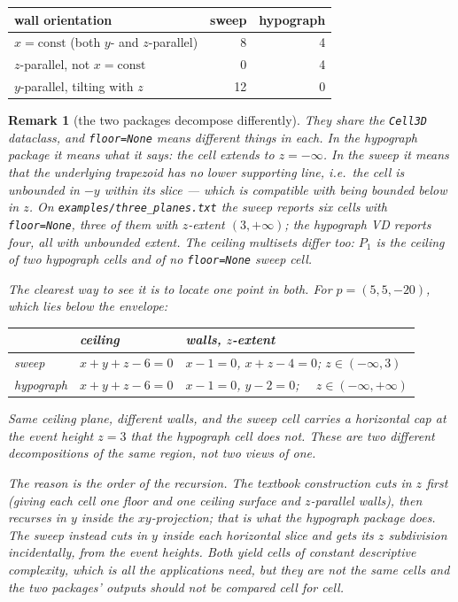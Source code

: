 \documentclass[11pt]{article}
\newtheorem{remark}{Remark}
\begin{document}
\begin{center}
\begin{tabular}{lrr}
\toprule
wall orientation & sweep & hypograph \\
\midrule
$x = \mathrm{const}$ (both $y$- and $z$-parallel) & 8 & 4 \\
$z$-parallel, not $x = \mathrm{const}$            & 0 & 4 \\
$y$-parallel, tilting with $z$                    & 12 & 0 \\
\bottomrule
\end{tabular}
\end{center}

\begin{remark}[the two packages decompose differently]
\label{rem:two-decompositions}
They share the \texttt{Cell3D} dataclass, and \verb|floor=None| means different
things in each.  In the hypograph package it means what it says: the cell
extends to $z = -\infty$.  In the sweep it means that the underlying trapezoid
has no lower supporting line, i.e.\ the cell is unbounded in $-y$ within its
slice --- which is compatible with being bounded below in $z$.  On
\texttt{examples/three\_planes.txt} the sweep reports six cells with
\verb|floor=None|, three of them with $z$-extent $(3, +\infty)$; the hypograph
VD reports four, all with unbounded extent.  The ceiling multisets differ too:
$P_1$ is the ceiling of two hypograph cells and of no \verb|floor=None| sweep
cell.

The clearest way to see it is to locate one point in both.  For
$p = (5,5,-20)$, which lies below the envelope:
\begin{center}
\begin{tabular}{lll}
\toprule
& ceiling & walls, $z$-extent \\
\midrule
sweep      & $x{+}y{+}z{-}6=0$ & $x-1=0$, $x+z-4=0$; \quad $z \in (-\infty, 3)$ \\
hypograph  & $x{+}y{+}z{-}6=0$ & $x-1=0$, $y-2=0$; \quad\ \ $z \in (-\infty, +\infty)$ \\
\bottomrule
\end{tabular}
\end{center}
Same ceiling plane, different walls, and the sweep cell carries a horizontal
cap at the event height $z = 3$ that the hypograph cell does not.  These are two
different decompositions of the same region, not two views of one.

The reason is the order of the recursion.  The textbook construction cuts in
$z$ first (giving each cell one floor and one ceiling surface and $z$-parallel
walls), then recurses in $y$ inside the $xy$-projection; that is what the
hypograph package does.  The sweep instead cuts in $y$ inside each horizontal
slice and gets its $z$ subdivision incidentally, from the event heights.  Both
yield cells of constant descriptive complexity, which is all the applications
need, but they are not the same cells and the two packages' outputs should not
be compared cell for cell.
\end{remark}
\end{document}
